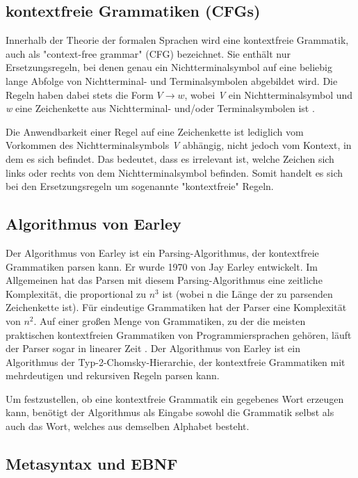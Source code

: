 \subsection*{kontextfreie Grammatiken (CFGs)}
Innerhalb der Theorie der formalen Sprachen wird eine kontextfreie Grammatik, auch als "context-free grammar" (CFG) bezeichnet. 
Sie enthält nur Ersetzungsregeln, bei denen genau ein Nichtterminalsymbol auf eine beliebig lange Abfolge von Nichtterminal- und Terminalsymbolen abgebildet wird.
Die Regeln haben dabei stets die Form $V \rightarrow w$, wobei \textit{V} ein Nichtterminalsymbol und \textit{w} eine Zeichenkette aus Nichtterminal- 
und/oder Terminalsymbolen ist \cite{NearleyGlossary}.

Die Anwendbarkeit einer Regel auf eine Zeichenkette ist lediglich vom Vorkommen des Nichtterminalsymbols \textit{V} abhängig, nicht jedoch vom Kontext, in dem es 
sich befindet. Das bedeutet, dass es irrelevant ist, welche Zeichen sich links oder rechts von dem Nichtterminalsymbol befinden. Somit handelt es sich bei 
den Ersetzungsregeln um sogenannte "kontextfreie" Regeln.

\subsection*{Algorithmus von Earley}
Der Algorithmus von Earley ist ein Parsing-Algorithmus, der kontextfreie Grammatiken parsen kann. Er wurde 1970 von Jay Earley entwickelt.
Im Allgemeinen hat das Parsen mit diesem Parsing-Algorithmus eine zeitliche Komplexität, die proportional zu $n^3$ ist (wobei n die Länge der zu parsenden 
Zeichenkette ist). Für eindeutige Grammatiken hat der Parser eine Komplexität von $n^2$. Auf einer großen Menge von Grammatiken, zu der die 
meisten praktischen kontextfreien Grammatiken von Programmiersprachen gehören, läuft der Parser sogar in linearer Zeit \cite{Earley1970}. 
Der Algorithmus von Earley ist ein Algorithmus der Typ-2-Chomsky-Hierarchie, der kontextfreie Grammatiken mit mehrdeutigen und rekursiven Regeln parsen kann. 

Um festzustellen, ob eine kontextfreie Grammatik ein gegebenes Wort erzeugen kann, benötigt der Algorithmus als Eingabe sowohl die Grammatik selbst 
als auch das Wort, welches aus demselben Alphabet besteht.

\subsection*{Metasyntax und EBNF}

